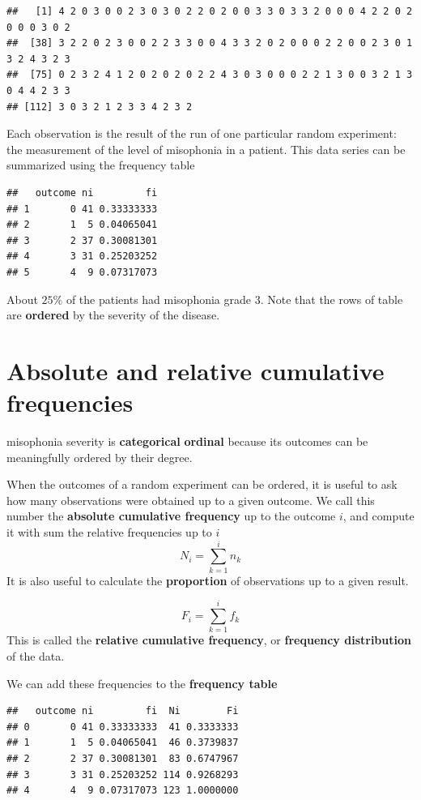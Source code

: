 \documentclass[
]{book}
\begin{document}
\begin{verbatim}
##   [1] 4 2 0 3 0 0 2 3 0 3 0 2 2 0 2 0 0 3 3 0 3 3 2 0 0 0 4 2 2 0 2 0 0 0 3 0 2
##  [38] 3 2 2 0 2 3 0 0 2 2 3 3 0 0 4 3 3 2 0 2 0 0 0 2 2 0 0 2 3 0 1 3 2 4 3 2 3
##  [75] 0 2 3 2 4 1 2 0 2 0 2 0 2 2 4 3 0 3 0 0 0 2 2 1 3 0 0 3 2 1 3 0 4 4 2 3 3
## [112] 3 0 3 2 1 2 3 3 4 2 3 2
\end{verbatim}

Each observation is the result of the run of one particular random experiment: the measurement of the level of misophonia in a patient. This data series can be summarized using the frequency table

\begin{verbatim}
##   outcome ni         fi
## 1       0 41 0.33333333
## 2       1  5 0.04065041
## 3       2 37 0.30081301
## 4       3 31 0.25203252
## 5       4  9 0.07317073
\end{verbatim}

About \(25\%\) of the patients had misophonia grade 3. Note that the rows of table are \textbf{ordered} by the severity of the disease.

\hypertarget{absolute-and-relative-cumulative-frequencies}{%
\section{Absolute and relative cumulative frequencies}\label{absolute-and-relative-cumulative-frequencies}}

misophonia severity is \textbf{categorical} \textbf{ordinal} because its outcomes can be meaningfully ordered by their degree.

When the outcomes of a random experiment can be ordered, it is useful to ask how many observations were obtained up to a given outcome. We call this number the \textbf{absolute cumulative frequency} up to the outcome \(i\), and compute it with sum the relative frequencies up to \(i\)
\[N_i =\sum_{k= 1}^i n_k\]
It is also useful to calculate the \textbf{proportion} of observations up to a given result.

\[F_i =\sum_{k= 1}^i f_k\]
This is called the \textbf{relative cumulative frequency}, or \textbf{frequency distribution} of the data.

We can add these frequencies to the \textbf{frequency table}

\begin{verbatim}
##   outcome ni         fi  Ni        Fi
## 0       0 41 0.33333333  41 0.3333333
## 1       1  5 0.04065041  46 0.3739837
## 2       2 37 0.30081301  83 0.6747967
## 3       3 31 0.25203252 114 0.9268293
## 4       4  9 0.07317073 123 1.0000000
\end{verbatim}
\end{document}
